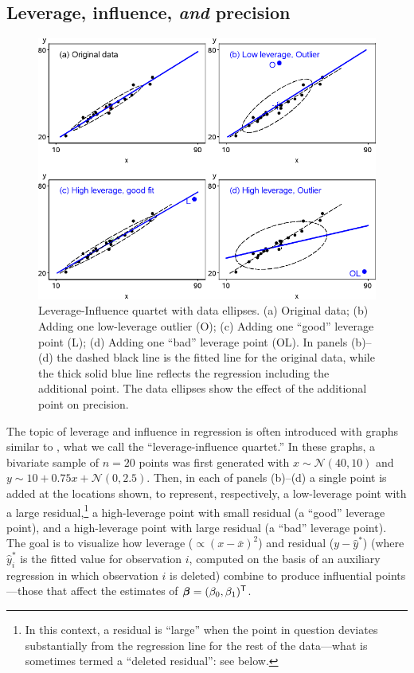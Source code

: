 \subsection{Leverage, influence, \emph{and} precision}

\begin{figure}[htb!]
  \centering
  \includegraphics[width=\textwidth,clip]{fig/levdemo21}
  \caption{Leverage-Influence quartet with data ellipses. (a) Original data;
  (b) Adding one low-leverage outlier (O); (c) Adding one ``good'' leverage point (L);
  (d) Adding one ``bad'' leverage point (OL).
  In panels (b)--(d) the dashed black line is the fitted line for the original
  data, while the thick solid blue line reflects the  regression including the additional point.
  The data ellipses show the effect of the additional point on precision.}%
  \label{fig:levdemo21}
\end{figure}

The topic of leverage and influence in regression is often introduced with graphs
similar to , what we call
the ``leverage-influence quartet.''
In these graphs, a bivariate sample of $n=20$ points was first generated
with $x \sim \mathcal{N}(40, 10)$ and $y \sim10 +  0.75 x + \mathcal{N}(0, 2.5)$.
Then, in each of
panels (b)--(d) a single point is added at the locations shown, to represent, respectively,
a low-leverage point with a large residual,\footnote{In this context, a residual is ``large'' when the point in question deviates substantially from the regression line for the rest of the data---what is sometimes termed a ``deleted residual'': see below.} a high-leverage point with small residual
(a ``good'' leverage point), and a high-leverage point with large residual
(a ``bad'' leverage point).  The goal is to visualize how leverage ($\propto (x-\bar{x})^2$) and
residual ($y - \hat{y}^{*}$) (where $\hat{y}^{*}_{i}$ is the fitted value for observation $i$, computed on the basis of an auxiliary regression in which observation $i$ is deleted) combine to produce influential points---those that affect
the estimates of $\bm{\beta} = (\beta_0 , \beta_1)^\mathsf{T}$.


